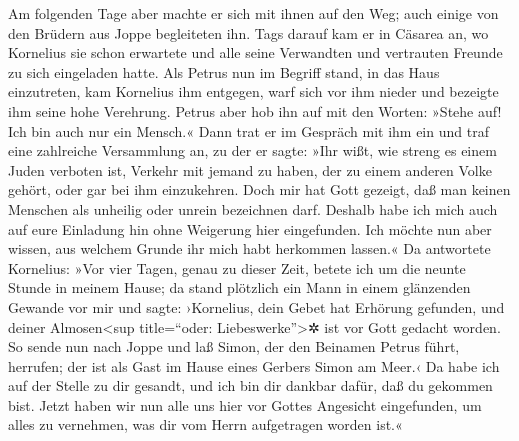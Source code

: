 Am folgenden Tage aber machte er sich mit ihnen auf den Weg; auch einige
von den Brüdern aus Joppe begleiteten ihn.  Tags darauf
kam er in Cäsarea an, wo Kornelius sie schon erwartete und alle seine
Verwandten und vertrauten Freunde zu sich eingeladen hatte.
 Als Petrus nun im Begriff stand, in das Haus
einzutreten, kam Kornelius ihm entgegen, warf sich vor ihm nieder und
bezeigte ihm seine hohe Verehrung.  Petrus aber hob ihn
auf mit den Worten: »Stehe auf! Ich bin auch nur ein Mensch.«
 Dann trat er im Gespräch mit ihm ein und traf eine
zahlreiche Versammlung an,  zu der er sagte: »Ihr wißt,
wie streng es einem Juden verboten ist, Verkehr mit jemand zu haben, der
zu einem anderen Volke gehört, oder gar bei ihm einzukehren. Doch mir
hat Gott gezeigt, daß man keinen Menschen als unheilig oder unrein
bezeichnen darf.  Deshalb habe ich mich auch auf eure
Einladung hin ohne Weigerung hier eingefunden. Ich möchte nun aber
wissen, aus welchem Grunde ihr mich habt herkommen lassen.«
 Da antwortete Kornelius: »Vor vier Tagen, genau zu
dieser Zeit, betete ich um die neunte Stunde in meinem Hause; da stand
plötzlich ein Mann in einem glänzenden Gewande vor mir 
und sagte: ›Kornelius, dein Gebet hat Erhörung gefunden, und deiner
Almosen\textless sup title=``oder: Liebeswerke''\textgreater✲ ist vor
Gott gedacht worden.  So sende nun nach Joppe und laß
Simon, der den Beinamen Petrus führt, herrufen; der ist als Gast im
Hause eines Gerbers Simon am Meer.‹  Da habe ich auf der
Stelle zu dir gesandt, und ich bin dir dankbar dafür, daß du gekommen
bist. Jetzt haben wir nun alle uns hier vor Gottes Angesicht
eingefunden, um alles zu vernehmen, was dir vom Herrn aufgetragen worden
ist.«

